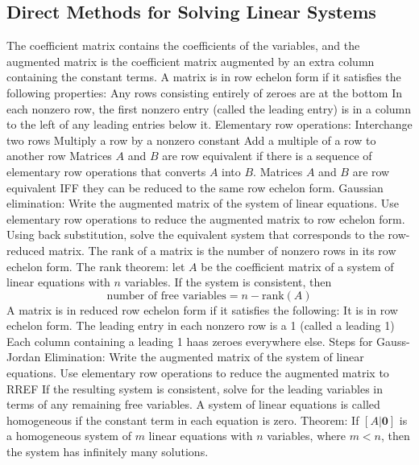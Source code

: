 \documentclass{article}
\begin{document}
    \subsection{Direct Methods for Solving Linear Systems}
    \begin{outline}
        \1 The coefficient matrix contains the coefficients of the variables, and the augmented matrix is the coefficient matrix augmented by an extra column containing the constant terms. 
        \1 A matrix is in row echelon form if it satisfies the following properties: 
            \2 Any rows consisting entirely of zeroes are at the bottom
            \2 In each nonzero row, the first nonzero entry (called the leading entry) is in a column to the left of any leading entries below it. 
        \1 Elementary row operations: 
            \2 Interchange two rows
            \2 Multiply a row by a nonzero constant
            \2 Add a multiple of a row to another row 
        \1 Matrices $A$ and $B$ are row equivalent if there is a sequence of elementary row operations that converts $A$ into $B$. 
        \1 Matrices $A$ and $B$ are row equivalent IFF they can be reduced to the same row echelon form. 
        \1 Gaussian elimination: 
            \2 Write the augmented matrix of the system of linear equations. 
            \2 Use elementary row operations to reduce the augmented matrix to row echelon form. 
            \2 Using back substitution, solve the equivalent system that corresponds to the row-reduced matrix. 
        \1 The rank of a matrix is the number of nonzero rows in its row echelon form. 
        \1 The rank theorem: let $A$ be the coefficient matrix of a system of linear equations with $n$ variables. If the system is consistent, then \[\text{number of free variables}=n-\text{rank}(A)\]
        \1 A matrix is in reduced row echelon form if it satisfies the following:
            \2 It is in row echelon form. 
            \2 The leading entry in each nonzero row is a 1 (called a leading 1)
            \2 Each column containing a leading 1 haas zeroes everywhere else. 
        \1 Steps for Gauss-Jordan Elimination: 
            \2 Write the augmented matrix of the system of linear equations. 
            \2 Use elementary row operations to reduce the augmented matrix to RREF
            \2 If the resulting system is consistent, solve for the leading variables in terms of any remaining free variables. 
        \1 A system of linear equations is called homogeneous if the constant term in each equation is zero. 
        \1 Theorem: If \([A|\mathbf 0]\) is a homogeneous system of $m$ linear equations with $n$ variables, where \(m<n\), then the system has infinitely many solutions. 
        
    \end{outline}
\end{document}
